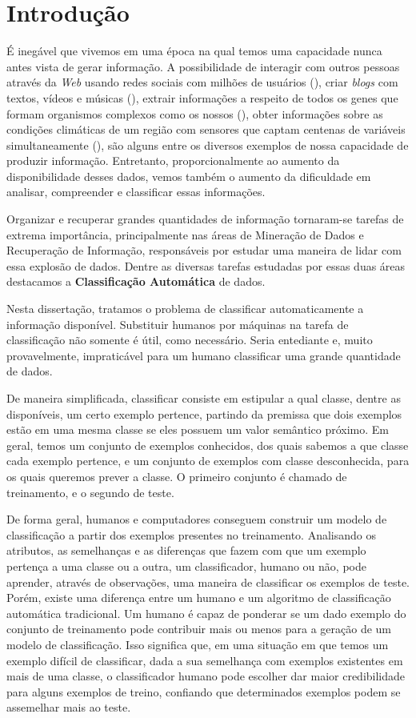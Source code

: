 \chapter{Introdução}
\label{cap::introducao}


É inegável que vivemos em uma época na qual temos uma capacidade nunca antes vista de gerar informação.
A possibilidade de interagir com outros pessoas através da \textit{Web} usando redes sociais com milhões de usuários (\cite{Thom11}), criar \textit{blogs} com textos, vídeos e músicas (\cite{Baxter10}), extrair informações a respeito de todos os genes que formam organismos complexos como os nossos (\cite{Williams01}), obter informações sobre as condições climáticas de um região com sensores que captam centenas de variáveis simultaneamente (\cite{Rotach09}), são alguns entre os diversos exemplos de nossa capacidade de produzir informação.
Entretanto, proporcionalmente ao aumento da disponibilidade desses dados, vemos também o aumento da dificuldade em analisar, compreender e classificar essas informações.

Organizar e recuperar grandes quantidades de informação tornaram-se tarefas de extrema importância, principalmente nas áreas de Mineração de Dados e Recuperação de Informação, responsáveis por estudar uma maneira de lidar com essa explosão de dados. Dentre as diversas tarefas estudadas por essas duas áreas destacamos a \textbf{Classificação Automática} de dados. 

Nesta dissertação, tratamos o problema de classificar automaticamente a informação disponível. 
Substituir humanos por máquinas na tarefa de classificação não somente é útil, como necessário. 
Seria entediante e, muito provavelmente, impraticável para um humano classificar uma grande quantidade de dados.

De maneira simplificada, classificar consiste em estipular a qual classe, dentre as disponíveis, um certo exemplo 
pertence, partindo da premissa que dois exemplos estão em uma mesma classe se eles possuem um valor semântico próximo. 
Em geral, temos um conjunto de exemplos conhecidos, dos quais sabemos a que classe cada exemplo pertence, e um conjunto de exemplos com classe desconhecida, para os quais queremos prever a classe. O primeiro conjunto é chamado de treinamento, e o segundo de teste. 

De forma geral, humanos e computadores conseguem construir um modelo de classificação a partir dos exemplos presentes no treinamento. 
Analisando os atributos, as semelhanças e as diferenças que fazem com que um exemplo pertença a uma classe ou a outra, um classificador, humano ou não, pode aprender, através de observações, uma maneira de classificar os exemplos de teste.
Porém, existe uma diferença entre um humano e um algoritmo de classificação automática tradicional. 
Um humano é capaz de ponderar se um dado exemplo do conjunto de treinamento pode contribuir mais ou menos para a geração de um modelo de classificação.
Isso significa que, em uma situação em que temos um exemplo difícil de classificar, dada a sua semelhança com exemplos existentes em mais de uma classe, o classificador humano pode escolher dar maior credibilidade para alguns exemplos de treino, confiando que determinados exemplos podem se assemelhar mais ao teste.

